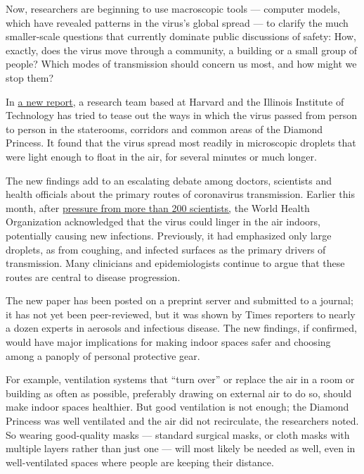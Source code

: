 Now, researchers are beginning to use macroscopic tools --- computer
models, which have revealed patterns in the virus's global spread --- to
clarify the much smaller-scale questions that currently dominate public
discussions of safety: How, exactly, does the virus move through a
community, a building or a small group of people? Which modes of
transmission should concern us most, and how might we stop them?

In
\href{https://www.medrxiv.org/content/10.1101/2020.07.13.20153049v1}{a
new report}, a research team based at Harvard and the Illinois Institute
of Technology has tried to tease out the ways in which the virus passed
from person to person in the staterooms, corridors and common areas of
the Diamond Princess. It found that the virus spread most readily in
microscopic droplets that were light enough to float in the air, for
several minutes or much longer.

The new findings add to an escalating debate among doctors, scientists
and health officials about the primary routes of coronavirus
transmission. Earlier this month, after
\href{https://www.nytimes3xbfgragh.onion/2020/07/04/health/239-experts-with-one-big-claim-the-coronavirus-is-airborne.html}{pressure
from more than 200 scientists,} the World Health Organization
acknowledged that the virus could linger in the air indoors, potentially
causing new infections. Previously, it had emphasized only large
droplets, as from coughing, and infected surfaces as the primary drivers
of transmission. Many clinicians and epidemiologists continue to argue
that these routes are central to disease progression.

The new paper has been posted on a preprint server and submitted to a
journal; it has not yet been peer-reviewed, but it was shown by Times
reporters to nearly a dozen experts in aerosols and infectious disease.
The new findings, if confirmed, would have major implications for making
indoor spaces safer and choosing among a panoply of personal protective
gear.

For example, ventilation systems that ``turn over'' or replace the air
in a room or building as often as possible, preferably drawing on
external air to do so, should make indoor spaces healthier. But good
ventilation is not enough; the Diamond Princess was well ventilated and
the air did not recirculate, the researchers noted. So wearing
good-quality masks --- standard surgical masks, or cloth masks with
multiple layers rather than just one --- will most likely be needed as
well, even in well-ventilated spaces where people are keeping their
distance.

